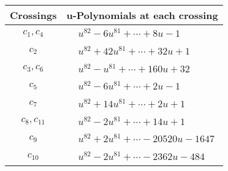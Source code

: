 \documentclass[1p]{elsarticle_modified}
\theoremstyle{definition}
\begin{document}
\begin{tabular}{m{50pt}|m{274pt}}
Crossings & \hspace{64pt}u-Polynomials at each crossing \\
\hline $$\begin{aligned}c_{1},c_{4}\end{aligned}$$&$\begin{aligned}
&u^{82}-6 u^{81}+\cdots+8 u-1
\end{aligned}$\\
\hline $$\begin{aligned}c_{2}\end{aligned}$$&$\begin{aligned}
&u^{82}+42 u^{81}+\cdots+32 u+1
\end{aligned}$\\
\hline $$\begin{aligned}c_{3},c_{6}\end{aligned}$$&$\begin{aligned}
&u^{82}- u^{81}+\cdots+160 u+32
\end{aligned}$\\
\hline $$\begin{aligned}c_{5}\end{aligned}$$&$\begin{aligned}
&u^{82}-6 u^{81}+\cdots+2 u-1
\end{aligned}$\\
\hline $$\begin{aligned}c_{7}\end{aligned}$$&$\begin{aligned}
&u^{82}+14 u^{81}+\cdots+2 u+1
\end{aligned}$\\
\hline $$\begin{aligned}c_{8},c_{11}\end{aligned}$$&$\begin{aligned}
&u^{82}-2 u^{81}+\cdots+14 u+1
\end{aligned}$\\
\hline $$\begin{aligned}c_{9}\end{aligned}$$&$\begin{aligned}
&u^{82}+2 u^{81}+\cdots-20520 u-1647
\end{aligned}$\\
\hline $$\begin{aligned}c_{10}\end{aligned}$$&$\begin{aligned}
&u^{82}-2 u^{81}+\cdots-2362 u-484
\end{aligned}$\\
\hline
\end{tabular}\\~\\
\end{document}
